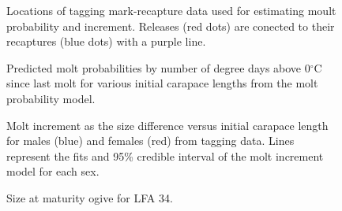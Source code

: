 \documentclass[11pt]{article}
\newcommand{\e}{/SpinDr/backup/bio_data/bio.lobster/figures/LFA3438Framework2019/} %
\begin{document}
    \begin{figure}
    \centering
        \caption{Locations of tagging mark-recapture data used for estimating moult probability and increment. Releases (red dots) are conected to their recaptures (blue dots) with a purple line.}

    \end{figure}

    \begin{figure}
    \centering
        \caption{Predicted molt probabilities by number of degree days above 0$^{\circ}$C since last molt for various initial carapace lengths from the molt probability model.}

    \end{figure}

    \begin{figure}
    \centering
        \caption{Molt increment as the size difference versus initial carapace length for males (blue) and females (red) from tagging data. Lines represent the fits and 95\% credible interval of the molt increment model for each sex.}

    \end{figure}    


    \begin{figure}
    \centering
        \caption{Size at maturity ogive for LFA 34.}

    \end{figure}    


    
\end{document}
